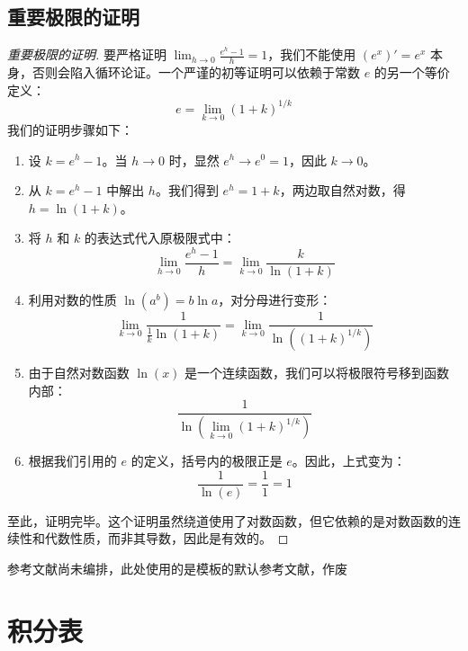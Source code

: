 \documentclass[lang=cn,newtx,10pt,scheme=chinese]{elegantbook}
\begin{document}
\section{重要极限的证明}\label{prf:ImtLim}
\begin{proof}[重要极限的证明]
  要严格证明 $\lim_{h \to 0} \frac{e^h - 1}{h} = 1$，我们不能使用 $(e^x)'=e^x$ 本身，否则会陷入循环论证。一个严谨的初等证明可以依赖于常数 $e$ 的另一个等价定义：
  \begin{equation}
    e = \lim_{k \to 0} (1+k)^{1/k}
  \end{equation}
  我们的证明步骤如下：
  \begin{enumerate}
    \item 设 $k = e^h - 1$。当 $h \to 0$ 时，显然 $e^h \to e^0 = 1$，因此 $k \to 0$。
    \item 从 $k = e^h - 1$ 中解出 $h$。我们得到 $e^h = 1+k$，两边取自然对数，得 $h = \ln(1+k)$。
    \item 将 $h$ 和 $k$ 的表达式代入原极限式中：
    \begin{equation}
      \lim_{h \to 0} \frac{e^h - 1}{h} = \lim_{k \to 0} \frac{k}{\ln(1+k)}
    \end{equation}
    \item 利用对数的性质 $\ln(a^b) = b\ln a$，对分母进行变形：
    \begin{equation}
      \lim_{k \to 0} \frac{1}{\frac{1}{k}\ln(1+k)} = \lim_{k \to 0} \frac{1}{\ln\left((1+k)^{1/k}\right)}
    \end{equation}
    \item 由于自然对数函数 $\ln(x)$ 是一个连续函数，我们可以将极限符号移到函数内部：
    \begin{equation}
      \frac{1}{\ln\left(\lim_{k \to 0}(1+k)^{1/k}\right)}
    \end{equation}
    \item 根据我们引用的 $e$ 的定义，括号内的极限正是 $e$。因此，上式变为：
    \begin{equation}
      \frac{1}{\ln(e)} = \frac{1}{1} = 1
    \end{equation}
  \end{enumerate}
  至此，证明完毕。这个证明虽然绕道使用了对数函数，但它依赖的是对数函数的连续性和代数性质，而非其导数，因此是有效的。
\end{proof}

\nocite{*}

\printbibliography[heading=bibintoc, title=\ebibname]
参考文献尚未编排，此处使用的是模板的默认参考文献，作废

\chapter{积分表}


\end{document}
